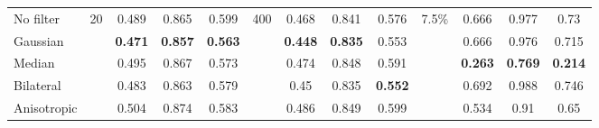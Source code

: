 \begin{table}[ht]
\begin{tabular}{rrrrrrrrrrrrr}
    
    \multicolumn{1}{l}{No filter} & \multirow{5}[2]{*}{20} & \multicolumn{1}{c}{0.489} & \multicolumn{1}{c}{0.865} & \multicolumn{1}{c}{0.599} & \multirow{5}[2]{*}{400} & \multicolumn{1}{c}{0.468} & \multicolumn{1}{c}{0.841} & \multicolumn{1}{c}{0.576} & \multirow{5}[2]{*}{7.5\%} & \multicolumn{1}{c}{0.666} & \multicolumn{1}{c}{0.977} & \multicolumn{1}{c}{0.73} \\
    \multicolumn{1}{l}{Gaussian} &       & \multicolumn{1}{c}{\textbf{0.471}} & \multicolumn{1}{c}{\textbf{0.857}} & \multicolumn{1}{c}{\textbf{0.563}} &       & \multicolumn{1}{c}{\textbf{0.448}} & \multicolumn{1}{c}{\textbf{0.835}} & \multicolumn{1}{c}{0.553} &       & \multicolumn{1}{c}{0.666} & \multicolumn{1}{c}{0.976} & \multicolumn{1}{c}{0.715} \\
    \multicolumn{1}{l}{Median} &       & \multicolumn{1}{c}{0.495} & \multicolumn{1}{c}{0.867} & \multicolumn{1}{c}{0.573} &       & \multicolumn{1}{c}{0.474} & \multicolumn{1}{c}{0.848} & \multicolumn{1}{c}{0.591} &       & \multicolumn{1}{c}{\textbf{0.263}} & \multicolumn{1}{c}{\textbf{0.769}} & \multicolumn{1}{c}{\textbf{0.214}} \\
    \multicolumn{1}{l}{Bilateral} &       & \multicolumn{1}{c}{0.483} & \multicolumn{1}{c}{0.863} & \multicolumn{1}{c}{0.579} &       & \multicolumn{1}{c}{0.45} & \multicolumn{1}{c}{0.835} & \multicolumn{1}{c}{\textbf{0.552}} &       & \multicolumn{1}{c}{0.692} & \multicolumn{1}{c}{0.988} & \multicolumn{1}{c}{0.746} \\
    \multicolumn{1}{l}{Anisotropic} &       & \multicolumn{1}{c}{0.504} & \multicolumn{1}{c}{0.874} & \multicolumn{1}{c}{0.583} &       & \multicolumn{1}{c}{0.486} & \multicolumn{1}{c}{0.849} & \multicolumn{1}{c}{0.599} &       & \multicolumn{1}{c}{0.534} & \multicolumn{1}{c}{0.91} & \multicolumn{1}{c}{0.65} \\
    
    \midrule
    

\end{tabular}
\end{table}
